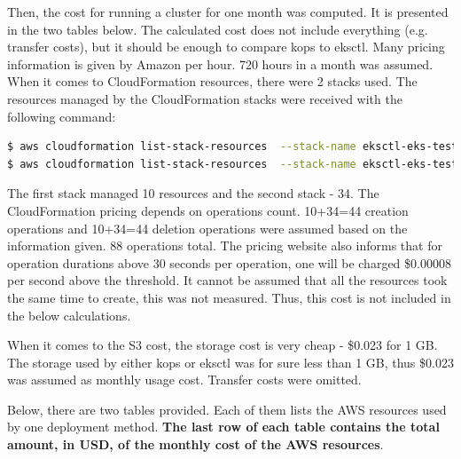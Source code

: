 Then, the cost for running a cluster for one month was computed. It is presented in the two tables below. The calculated cost does not include everything (e.g. transfer costs), but it should be enough to compare kops to eksctl. Many pricing information is given by Amazon per hour. 720 hours in a month was assumed. When it comes to CloudFormation resources, there were 2 stacks used. The resources managed by the CloudFormation stacks were received with the following command:
\begin{lstlisting}[basicstyle=\tiny,caption={AWS CLI commands used to list CloudFormation resources used by eksctl},captionpos=b,language=Bash,xleftmargin=1cm]
$ aws cloudformation list-stack-resources  --stack-name eksctl-eks-testing-nodegroup-ng-1
$ aws cloudformation list-stack-resources  --stack-name eksctl-eks-testing-cluster
\end{lstlisting}
The first stack managed 10 resources and the second stack - 34. The CloudFormation pricing\cite{amazon-cf-pricing} depends on operations count. 10+34=44 creation operations and 10+34=44 deletion operations were assumed based on the information given. 88 operations total. The pricing website also informs that for operation durations above 30 seconds per operation, one will be charged \$0.00008 per second above the threshold. It cannot be assumed that all the resources took the same time to create, this was not measured. Thus, this cost is not included in the below calculations.

When it comes to the S3 cost, the storage cost is very cheap - \$0.023 for 1 GB\cite{s3-pricing}. The storage used by either kops or eksctl was for sure less than 1 GB, thus \$0.023 was assumed as monthly usage cost. Transfer costs were omitted.

Below, there are two tables provided. Each of them lists the AWS resources used by one deployment method. \textbf{The last row of each table contains the total amount, in USD, of the monthly cost of the AWS resources}.

